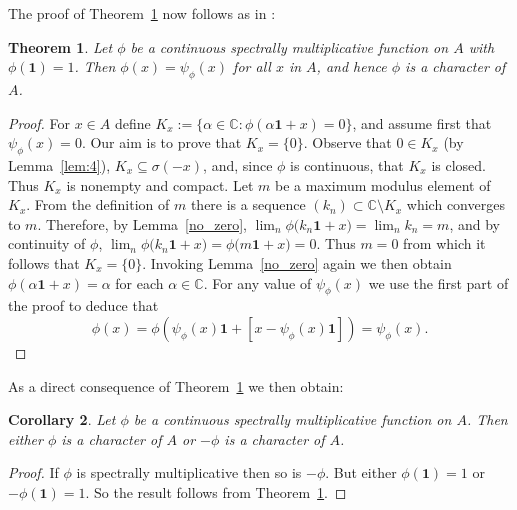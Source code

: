 \documentclass{amsart}
\newtheorem{theorem}{Theorem}[section]
\newtheorem{corollary}[theorem]{Corollary}
\theoremstyle{definition}
\theoremstyle{remark}
\newcommand{\identity}{\mathbf{1}}
\begin{document}
  	The proof of Theorem~\ref{character} now follows as in \cite{Toure2}:
  	
  	\begin{theorem}\label{character}
  		Let  $\phi$ be a 
  		continuous spectrally multiplicative  function on $A$ with $\phi(\identity)=1$. Then $\phi(x) = \psi_\phi(x)$ for all  $x$ in $A$, and hence $\phi$ is a character of $A$. 
  	\end{theorem}
  	
  	\begin{proof}
  		For $x\in A$ define $K_x:=\{\alpha \in \mathbb{C} : \phi(\alpha\mathbf{1}+x)=0\}$, and assume first that $\psi_\phi(x)=0$. Our aim is to prove that $K_x=\{0\}$. Observe that $0 \in K_x$ (by Lemma~\ref{lem:4}), $K_x \subseteq \sigma(-x)$, and, since $\phi$ is continuous, that $K_x$ is closed. Thus $K_x$ is nonempty and compact.  Let $m$  be a maximum modulus element of  $K_x$. From the definition of $m$ there is a sequence $(k_n) \subset\mathbb C\setminus K_x$ which converges to $m$.  Therefore, by Lemma~\ref{no_zero},  $\lim_n\phi\big(k_n\mathbf{1}+x \big)=\lim_n k_n =m $, and by continuity of $\phi$, $\lim_n\phi\big(k_n\mathbf{1}+x \big)=\phi\big(m\mathbf{1}+x \big)=0 $. Thus $m=0$ from which it follows that $K_x=\{0\}$. Invoking Lemma~\ref{no_zero} again we then obtain $\phi(\alpha\mathbf{1}+x)=\alpha$ for each $\alpha\in\mathbb C$. For any value of $ \psi_\phi(x) $ we use the first part of the proof to deduce that  $$  \phi(x)=\phi\left(  \psi_\phi(x)\mathbf{1}+\left[x-\psi_\phi(x)\mathbf{1}\right] \right)= \psi_\phi(x). $$
  		\end{proof}
  	
  	
  	As a direct consequence of Theorem~\ref{character} we then obtain: 
  	
  	\begin{corollary}\label{character1}
  		Let  $\phi$ be a 
  		continuous spectrally multiplicative  function on $A$. Then  either $\phi$ is a character of $A$ or $-\phi$ is a character of $A$.
  	\end{corollary}
  	\begin{proof}
  		If $\phi$ is spectrally multiplicative then so is $-\phi$. But either $\phi\left(\identity\right)=1$ or $-\phi\left(\identity\right)=1$.  So the result follows from Theorem~\ref{character}.
  	\end{proof}
  	
\end{document}
